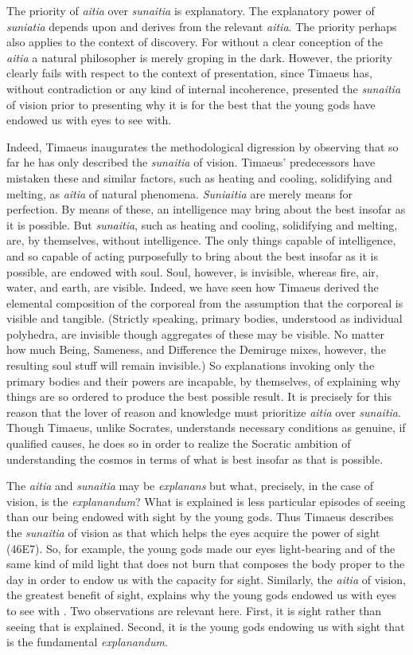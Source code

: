 The priority of \emph{aitia} over \emph{sunaitia} is explanatory. The explanatory power of \emph{suniatia} depends upon and derives from the relevant \emph{aitia}. The priority perhaps also applies to the context of discovery. For without a clear conception of the \emph{aitia} a natural philosopher is merely groping in the dark. However, the priority clearly fails with respect to the context of presentation, since Timaeus has, without contradiction or any kind of internal incoherence, presented the \emph{sunaitia} of vision prior to presenting why it is for the best that the young gods have endowed us with eyes to see with.

Indeed, Timaeus inaugurates the methodological digression by observing that so far he has only described the \emph{sunaitia} of vision. Timaeus' predecessors have mistaken these and similar factors, such as heating and cooling, solidifying and melting, as \emph{aitia} of natural phenomena. \emph{Suniaitia} are merely means for perfection. By means of these, an intelligence may bring about the best insofar as it is possible. But \emph{sunaitia}, such as heating and cooling, solidifying and melting, are, by themselves, without intelligence. The only things capable of intelligence, and so capable of acting purposefully to bring about the best insofar as it is possible, are endowed with soul. Soul, however, is invisible, whereas fire, air, water, and earth, are visible. Indeed, we have seen how Timaeus derived the elemental composition of the corporeal from the assumption that the corporeal is visible and tangible. (Strictly speaking, primary bodies, understood as individual polyhedra, are invisible though aggregates of these may be visible. No matter how much Being, Sameness, and Difference the Demiruge mixes, however, the resulting soul stuff will remain invisible.) So explanations invoking only the primary bodies and their powers are incapable, by themselves, of explaining why things are so ordered to produce the best possible result. It is precisely for this reason that the lover of reason and knowledge must prioritize \emph{aitia} over \emph{sunaitia}. Though Timaeus, unlike Socrates, understands necessary conditions as genuine, if qualified causes, he does so in order to realize the Socratic ambition of understanding the cosmos in terms of what is best insofar as that is possible. 

The \emph{aitia} and \emph{sunaitia} may be \emph{explanans} but what, precisely, in the case of vision, is the \emph{explanandum}? What is explained is less particular episodes of seeing than our being endowed with sight by the young gods. Thus Timaeus describes the \emph{sunaitia} of vision as that which helps the eyes acquire the power of sight (46E7). So, for example, the young gods made our eyes light-bearing and of the same kind of mild light that does not burn that composes the body proper to the day in order to endow us with the capacity for sight. Similarly, the \emph{aitia} of vision, the greatest benefit of sight, explains why the young gods endowed us with eyes to see with \citep[107--9]{Johansen:2004dx}. Two observations are relevant here. First, it is sight rather than seeing that is explained. Second, it is the young gods endowing us with sight that is the fundamental \emph{explanandum}.

